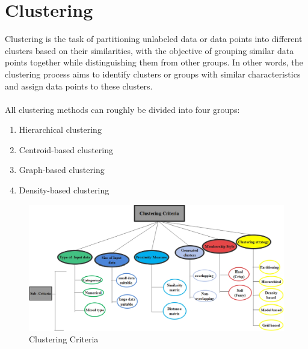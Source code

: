 \documentclass{template}
\begin{document}
\chapter{Clustering}\label{ch:me}
Clustering is the task of partitioning unlabeled data or data points into different clusters based on their similarities, with the objective of grouping similar data points together while distinguishing them from other groups. In other words, the clustering process aims to identify clusters or groups with similar characteristics and assign data points to these clusters.\\\\
All clustering methods can roughly be divided into four groups:
\begin{enumerate}
  \item Hierarchical clustering
  \item Centroid-based clustering
  \item Graph-based clustering
  \item Density-based clustering
\end{enumerate}
\begin{figure}
\includegraphics[scale=0.4]{Clustering.png}
\caption{Clustering Criteria}
\label{fig:logo}
\end{figure}
\end{document}

